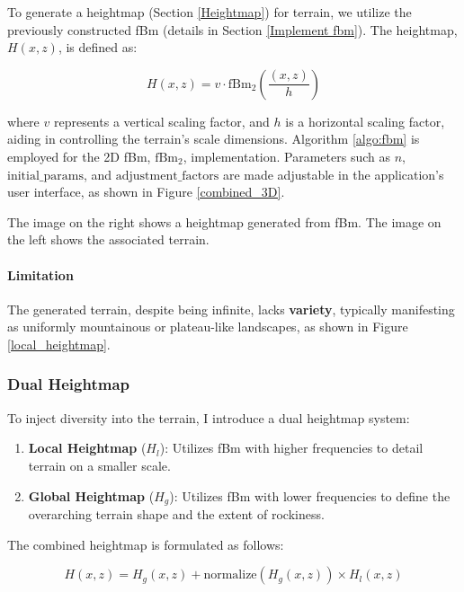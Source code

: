 To generate a heightmap (Section \ref{Heightmap}) for terrain, we utilize the previously constructed fBm (details in Section \ref{Implement fbm}). The heightmap, $H(x,z)$, is defined as:

\begin{equation}
    H(x,z) = v\cdot\text{fBm}_{2}(\frac{(x,z)}{h})
\end{equation}

where $v$ represents a vertical scaling factor, and $h$ is a horizontal scaling factor, aiding in controlling the terrain's scale dimensions. Algorithm \ref{algo:fbm} is employed for the 2D fBm, $\text{fBm}_{2}$, implementation. Parameters such as $n$, $\text{initial\_params}$, and $\text{adjustment\_factors}$ are made adjustable in the application's user interface, as shown in Figure \ref{combined_3D}.

{The image on the right shows a heightmap generated from fBm. The image on the left shows the associated terrain.}

\paragraph{Limitation}
The generated terrain, despite being infinite, lacks \textbf{variety}, typically manifesting as uniformly mountainous or plateau-like landscapes, as shown in Figure \ref{local_heightmap}.


\subsubsection{Dual Heightmap}

To inject diversity into the terrain, I introduce a dual heightmap system:

\begin{enumerate}
    \item \textbf{Local Heightmap} ($H_{l}$): Utilizes fBm with higher frequencies to detail terrain on a smaller scale.
    \item \textbf{Global Heightmap} ($H_{g}$): Utilizes fBm with lower frequencies to define the overarching terrain shape and the extent of rockiness.
\end{enumerate}

The combined heightmap is formulated as follows:

\begin{equation}
H(x,z) = H_{g}(x,z) + \text{normalize}(H_{g}(x,z))\times H_{l}(x,z)
\end{equation}

